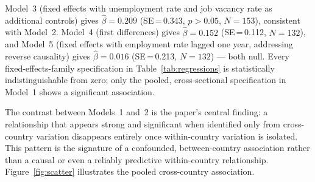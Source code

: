 \documentclass[12pt,a4paper]{article}
\begin{document}
Model~3 (fixed effects with unemployment rate and job vacancy rate as additional
controls) gives $\hat{\beta}=0.209$ (SE\,=\,0.343, $p>0.05$, $N=153$),
consistent with Model~2.  Model~4 (first differences) gives
$\hat{\beta}=0.152$ (SE\,=\,0.112, $N=132$), and Model~5 (fixed effects with
employment rate lagged one year, addressing reverse causality) gives
$\hat{\beta}=0.016$ (SE\,=\,0.213, $N=132$) --- both null.  Every
fixed-effects-family specification in Table~\ref{tab:regressions} is
statistically indistinguishable from zero; only the pooled, cross-sectional
specification in Model~1 shows a significant association.

The contrast between Models~1 and~2 is the paper's central finding: a
relationship that appears strong and significant when identified only from
cross-country variation disappears entirely once within-country variation is
isolated.  This pattern is the signature of a confounded, between-country
association rather than a causal or even a reliably predictive within-country
relationship.  Figure~\ref{fig:scatter} illustrates the pooled cross-country
association.
\end{document}
